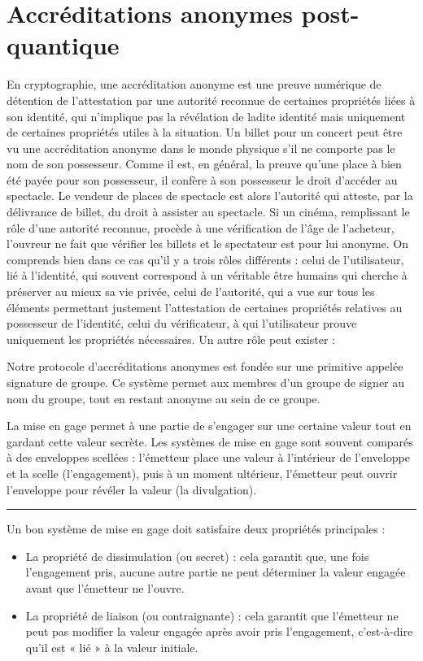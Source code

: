 
\section{Accréditations anonymes post-quantique} %


En cryptographie, une accréditation anonyme est une preuve numérique de détention de l’attestation par une autorité reconnue de certaines propriétés liées à son identité, qui n’implique pas la révélation de ladite identité mais uniquement de certaines propriétés utiles à la situation. Un billet pour un concert peut être vu une accréditation anonyme dans le monde physique s’il ne comporte pas le nom de son possesseur. Comme il est, en général, la preuve qu’une place à bien été payée pour son possesseur, il confère à son possesseur le droit d’accéder au spectacle. Le vendeur de places de spectacle est alors l’autorité qui atteste, par la délivrance de billet, du droit à assister au spectacle. Si un cinéma, remplissant le rôle d’une autorité reconnue, procède à une vérification de l’âge de l’acheteur, l’ouvreur ne fait que vérifier les billets et le spectateur est pour lui anonyme. On comprends bien dans ce cas qu’il y a trois rôles différents : celui de l’utilisateur, lié à l’identité, qui souvent correspond à un véritable être humains qui cherche à préserver au mieux sa vie privée, celui de l’autorité, qui a vue sur tous les éléments permettant justement l’attestation de certaines propriétés relatives au possesseur de l’identité, celui du vérificateur, à qui l’utilisateur prouve uniquement les propriétés nécessaires. Un autre rôle peut exister :\par
Notre protocole d’accréditations anonymes est fondée sur une primitive appelée signature de groupe. Ce système permet aux membres d’un groupe de signer au nom du groupe, tout en restant anonyme au sein de ce groupe.\par 
La mise en gage permet à une partie de s'engager sur une certaine valeur tout en gardant cette valeur secrète. Les systèmes de mise en gage sont souvent comparés à des enveloppes scellées : l'émetteur place une valeur à l'intérieur de l'enveloppe et la scelle (l'engagement), puis à un moment ultérieur, l'émetteur peut ouvrir l'enveloppe pour révéler la valeur (la divulgation).\par

\hrule

Un bon système de mise en gage doit satisfaire deux propriétés principales :
\begin{itemize}
  \item La propriété de dissimulation (ou secret) : cela garantit que, une fois l'engagement pris, aucune autre partie ne peut déterminer la valeur engagée avant que l'émetteur ne l'ouvre.
  \item La propriété de liaison (ou contraignante) : cela garantit que l'émetteur ne peut pas modifier la valeur engagée après avoir pris l'engagement, c'est-à-dire qu'il est « lié » à la valeur initiale.
\end{itemize}

